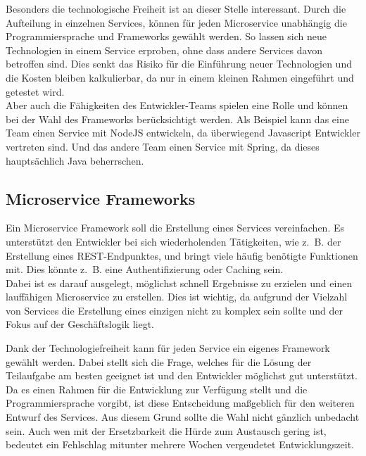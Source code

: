 Besonders die technologische Freiheit ist an dieser Stelle interessant. Durch die Aufteilung in einzelnen Services, können für jeden Microservice unabhängig die Programmiersprache und Frameworks gewählt werden. So lassen sich neue Technologien in einem Service erproben, ohne dass andere Services davon betroffen sind. Dies senkt das Risiko für die Einführung neuer Technologien und die Kosten bleiben kalkulierbar\cite[13]{Wolff2015}, da nur in einem kleinen Rahmen eingeführt und getestet wird.\\ 
Aber auch die Fähigkeiten des Entwickler-Teams spielen eine Rolle und können bei der Wahl des Frameworks berücksichtigt werden. Als Beispiel kann das eine Team einen Service mit NodeJS entwickeln, da überwiegend Java\-script Entwickler vertreten sind. Und das andere Team einen Service mit Spring, da dieses hauptsächlich Java beherrschen.

\subsection{Microservice Frameworks}\label{Microservice_Frameworks}

Ein Microservice Framework soll die Erstellung eines Services vereinfachen. Es unterstützt den Entwickler bei sich wiederholenden Tätigkeiten, wie z.~B. der Erstellung eines \ac{REST}-Endpunktes, und bringt viele häufig benötigte Funktionen mit. Dies könnte z.~B. eine Authentifizierung oder Caching sein.\\
Dabei ist es darauf ausgelegt, möglichst schnell Ergebnisse zu erzielen und einen lauffähigen Microservice zu erstellen. Dies ist wichtig, da aufgrund der Vielzahl von Services die Erstellung eines einzigen nicht zu komplex sein sollte und der Fokus auf der Geschäftslogik liegt. 

Dank der Technologiefreiheit kann für jeden Service ein eigenes Framework gewählt werden. Dabei stellt sich die Frage, welches für die Lösung der Teilaufgabe am besten geeignet ist und den Entwickler möglichst gut unterstützt.\\
Da es einen Rahmen für die Entwicklung zur Verfügung stellt und die Programmiersprache vorgibt, ist diese Entscheidung maßgeblich für den weiteren Entwurf des Services. Aus diesem Grund sollte die Wahl nicht gänzlich unbedacht sein. Auch wen mit der Ersetzbarkeit die Hürde zum Austausch gering ist, bedeutet ein Fehlschlag mitunter mehrere Wochen vergeudetet Entwicklungszeit.

